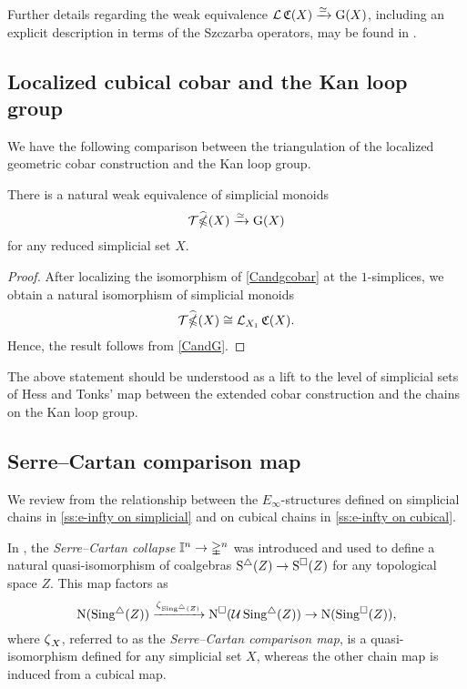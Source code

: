 Further details regarding the weak equivalence $\operatorname{\mathcal{L}} \operatorname{\mathfrak{C}}(X) \xrightarrow{\simeq} \operatorname{G}(X)$, including an explicit description in terms of the Szczarba operators, may be found in \cite{minichello2021path}.

\subsection{Localized cubical cobar and the Kan loop group}

We have the following comparison between the triangulation of the localized geometric cobar construction and the Kan loop group.

\begin{corollary} \label{widehatgcobarandG}
	There is a natural weak equivalence of simplicial monoids
	\begin{equation*}
	\mathcal{T} \widehat{\operatorname{\mathbb{\Omega}}}(X) \xrightarrow{\simeq} \operatorname{G}(X)
	\end{equation*}
	for any reduced simplicial set $X$.
\end{corollary}

\begin{proof}
	After localizing the isomorphism of \cref{Candgcobar} at the $1$-simplices, we obtain a natural isomorphism of simplicial monoids
	$$\mathcal{T} \widehat{\operatorname{\mathbb{\Omega}}}(X) \cong \operatorname{\mathcal{L}}_{X_1}\operatorname{\mathfrak{C}}(X).$$
	Hence, the result follows from \cref{CandG}.
\end{proof}

The above statement should be understood as a lift to the level of simplicial sets of Hess and Tonks' map between the extended cobar construction and the chains on the Kan loop group.

\subsection{Serre--Cartan comparison map}

We review from \cite{medina2021cubical} the relationship between the $E_\infty$-structures defined on simplicial chains in \cref{ss:e-infty on simplicial} and on cubical chains in \cref{ss:e-infty on cubical}.

In \cite[sect]{serre1951homologie}, the \textit{Serre--Cartan collapse} $\mathbb{I}^n \to \mathbb{\Delta}^n$ was introduced and used to define a natural quasi-isomorphism of coalgebras $\operatorname{S^{\triangle}}(Z) \to \operatorname{S^{\square}}(Z)$ for any topological space $Z$.
This map factors as
\begin{equation*}
\operatorname{N}(\operatorname{Sing^{\triangle}}(Z)) \xrightarrow{\operatorname{\zeta}_{\operatorname{Sing^{\triangle}}(Z)}}
\operatorname{N^{\square}}(\mathcal{U} \operatorname{Sing^{\triangle}}(Z)) \to
\operatorname{N}(\operatorname{Sing^{\square}}(Z)),
\end{equation*}
where $\operatorname{\zeta}_X$, referred to as the \textit{Serre--Cartan comparison map}, is a quasi-isomorphism defined for any simplicial set $X$, whereas the other chain map is induced from a cubical map.

